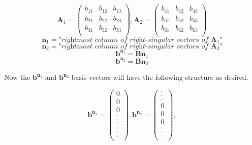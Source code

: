 \begin{equation}
\textbf{A}_1 = 
\begin{pmatrix}
b_{11} & b_{12} & b_{13} \\
b_{21} & b_{22} & b_{23} \\
b_{31} & b_{32} & b_{33} \\
\end{pmatrix},
\textbf{A}_2 = 
\begin{pmatrix}
b_{41} & b_{42} & b_{43} \\
b_{51} & b_{52} & b_{53} \\
b_{61} & b_{62} & b_{63} \\
\end{pmatrix}
\end{equation}
\begin{equation}
\textbf{n}_1 = \textit{"rightmost column of right-singular vectors of }\textbf{A}_1\textit{"}
\end{equation}
\begin{equation}
\textbf{n}_2 = \textit{"rightmost column of right-singular vectors of }\textbf{A}_2\textit{"}
\end{equation}
\begin{equation}
\textbf{b}^{\textbf{n}_1} = \textbf{B}\textbf{n}_1
\end{equation}
\begin{equation}
\textbf{b}^{\textbf{n}_2} = \textbf{B}\textbf{n}_2
\end{equation}

Now the $\textbf{b}^{\textbf{n}_1}$ and $\textbf{b}^{\textbf{n}_2}$ basis vectors will have the following structure as desired.

\begin{equation}
\textbf{b}^{\textbf{n}_1} =
\begin{pmatrix}
0 \\
0 \\
0 \\
. \\
. \\
. \\
. \\
. \\
. \\
\end{pmatrix},
\textbf{b}^{\textbf{n}_2} =
\begin{pmatrix}
. \\
. \\
. \\
0 \\
0 \\
0 \\
. \\
. \\
. \\
\end{pmatrix},
\end{equation}

